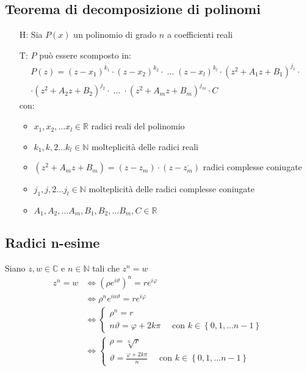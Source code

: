 \documentclass[a4paper]{article}
\begin{document}
\subsection{Teorema di decomposizione di polinomi}
\begin{itemize}
	\item[H:] Sia \(P(x)\) un polinomio di grado \(n\) a coefficienti reali
	\item[T:] \(P\) può essere scomposto in:
	\begin{multline*}
		P(z) = \left( z - x_1 \right) ^ {k_1} \cdot \left( z - x_2 \right) ^ {k_2} \cdot \; \dots \; \left( z - x_l \right) ^ {k_l} \cdot \left( z^2 + A_1 z + B_1 \right) ^ {j_1} \cdot \\
		\cdot \left( z^2 + A_2 z + B_2 \right) ^ {j_2} \cdot \; \dots \; \cdot \left( z^2 + A_m z + B_m \right) ^ {j_m} \cdot  C
	\end{multline*}
	con:
	\begin{itemize}
		\item \(x_1, x_2, \dots x_l \in \mathbb{R}\) radici reali del polinomio
		\item \(k_1, k,2 \dots k_l \in \mathbb{N}\) molteplicità delle radici reali
		\item \(\left( z^2 + A_m z + B_m \right) = \left( z - z_m \right) \cdot \left( z - \overline{z_m} \right)\) radici complesse coniugate
		\item \(j_1, j,2 \dots j_l \in \mathbb{N}\) molteplicità delle radici complesse coniugate
		\item \(A_1, A_2, \dots A_m, B_1, B_2, \dots B_m, C \in \mathbb{R}\)
	\end{itemize}
\end{itemize}

\subsection{Radici n-esime}
Siano \(z, w \in \mathbb{C}\) e \(n \in \mathbb{N}\) tali che \(z ^ n = w\)
\begin{align*}
	z ^ n = w &\Leftrightarrow \left( \rho e ^ {i \vartheta} \right) ^ n = r e ^ {i \varphi} \\
	&\Leftrightarrow \rho ^ n e ^ {i n \vartheta} = r e ^ {i \varphi} \\
	&\Leftrightarrow
	\begin{cases}
		\rho ^ n = r \\
		n \vartheta = \varphi + 2 k \pi \quad \text{ con } k \in \left\{ 0, 1, \dots n-1 \right\}
	\end{cases} \\
	&\Leftrightarrow
	\begin{cases}
		\rho = \sqrt[n]{r} \\
		\vartheta = \frac{\varphi + 2k\pi}{n} \quad \text{ con } k \in \left\{ 0, 1, \dots n-1 \right\}
	\end{cases}
\end{align*}
\end{document}
